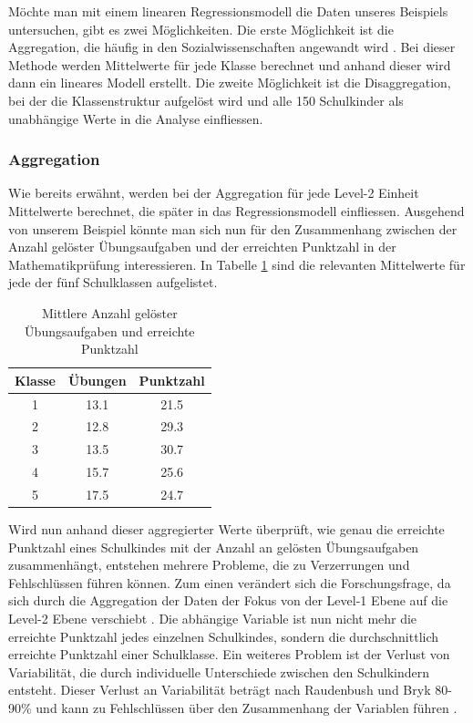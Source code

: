 \documentclass[12pt, a4paper]{article}\usepackage[]{graphicx}\usepackage[]{color}
\begin{document}
Möchte man mit einem linearen Regressionsmodell die Daten unseres Beispiels untersuchen, gibt es zwei Möglichkeiten. Die erste Möglichkeit ist die Aggregation, die häufig in den Sozialwissenschaften angewandt wird \citep{SnijdersTomA.B2012Ma:a}. Bei dieser Methode werden Mittelwerte für jede Klasse berechnet und anhand dieser wird dann ein lineares Modell erstellt. Die zweite Möglichkeit ist die Disaggregation, bei der die Klassenstruktur aufgelöst wird und alle 150 Schulkinder als unabhängige Werte in die Analyse einfliessen.

\subsubsection{Aggregation}
Wie bereits erwähnt, werden bei der Aggregation für jede Level-2 Einheit Mittelwerte berechnet, die später in das Regressionsmodell einfliessen. Ausgehend von unserem Beispiel könnte man sich nun für den Zusammenhang zwischen der Anzahl gelöster Übungsaufgaben und der erreichten Punktzahl in der Mathematikprüfung interessieren. In Tabelle \ref{tab:aggregation} sind die relevanten Mittelwerte für jede der fünf Schulklassen aufgelistet.

\begin{table}[b]
\centering
\begin{threeparttable}
\caption{Mittlere Anzahl gelöster Übungsaufgaben und erreichte Punktzahl}
\begin{tabular}{ccc}
  \toprule
Klasse & Übungen & Punktzahl \\ 
  \midrule
1 & 13.1 & 21.5 \\ 
2 & 12.8 & 29.3 \\ 
3 & 13.5 & 30.7 \\ 
4 & 15.7 & 25.6 \\ 
5 & 17.5 & 24.7 \\ 
   \bottomrule
\end{tabular}
\label{tab:aggregation}
\end{threeparttable}
\end{table}

Wird nun anhand dieser aggregierter Werte überprüft, wie genau die erreichte Punktzahl eines Schulkindes mit der Anzahl an gelösten Übungsaufgaben zusammenhängt, entstehen mehrere Probleme, die zu Verzerrungen und Fehlschlüssen führen können. Zum einen verändert sich die Forschungsfrage, da sich durch die Aggregation der Daten der Fokus von der Level-1 Ebene auf die Level-2 Ebene verschiebt \citep{SnijdersTomA.B2012Ma:a, woltman2012introduction}. Die abhängige Variable ist nun nicht mehr die erreichte Punktzahl jedes einzelnen Schulkindes, sondern die durchschnittlich erreichte Punktzahl einer Schulklasse. Ein weiteres Problem ist der Verlust von Variabilität, die durch individuelle Unterschiede zwischen den Schulkindern entsteht. Dieser Verlust an Variabilität beträgt nach Raudenbush und Bryk 80-90\% und kann zu Fehlschlüssen über den Zusammenhang der Variablen führen \citep{raudenbush2002hierarchical}. 
\end{document}
